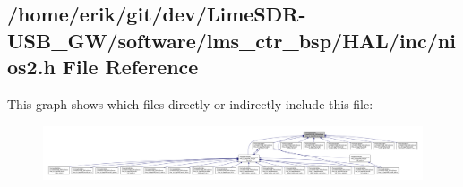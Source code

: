 \subsection{/home/erik/git/dev/\+Lime\+S\+D\+R-\/\+U\+S\+B\+\_\+\+G\+W/software/lms\+\_\+ctr\+\_\+bsp/\+H\+A\+L/inc/nios2.h File Reference}
\label{nios2_8h}
This graph shows which files directly or indirectly include this file\+:
\nopagebreak
\begin{figure}[H]
\begin{center}
\leavevmode
\includegraphics[width=350pt]{df/dcd/nios2_8h__dep__incl}
\end{center}
\end{figure}
